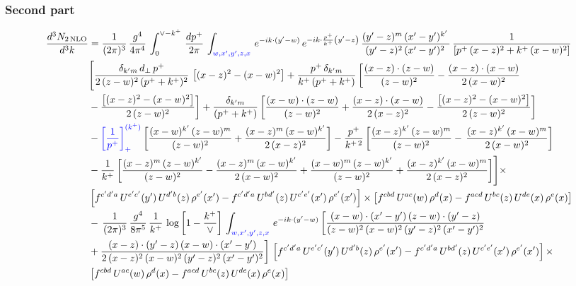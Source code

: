 \documentclass[9pt]{article}
\newcommand{\new}[1]{{\color{blue}#1}}
\numberwithin{equation}{section}
\begin{document}
\subsubsection{Second part}
\begin{align}
 \frac{d^{3}N_{2\,\rm NLO}}{d^{3}k} & = \frac{1}{(2\pi)^{3}}\,\frac{g^{4}}{4\pi^{4}}\,\int_{0}^{\vee-k^{+}}\, \frac{dp^{+}}{2\pi}\,\int_{\new{w,x',y',z,x}}\, e^{-ik\cdot (y'-w)}\,e^{-ik\cdot \frac{p^{+}}{k^{+}}\left(y'-z\right)}\, \frac{(y'-z)^{m}\,(x'-y')^{k'}\,}{(y'-z)^{2}\,(x'-y')^{2}\,}\, \frac{1}{\left[p^{+}\,(x-z)^{2}+k^{+}\,(x-w)^{2}\right]}\notag \\ & \Bigg[\frac{\delta_{k'm}\,d_{\perp}\,p^{+}}{2\,(z-w)^{2}\,(p^{+}+k^{+})^{2}}\, \left[(x-z)^{2}-(x-w)^{2}\right]+\frac{p^{+}\,\delta_{k'm}}{k^{+}\,(p^{+}+k^{+})}\,\bigg[\frac{(x-z)\cdot (z-w)}{(z-w)^{2}} -\frac{(x-z)\cdot (x-w)}{2\,(x-w)^{2}}\notag \\ & -\frac{\left[(x-z)^{2}-(x-w)^{2}\right]}{2\,(z-w)^{2}}\bigg] +\frac{\delta_{k'm}}{(p^{+}+k^{+})}\,\bigg[\frac{(x-w)\cdot (z-w)}{(z-w)^{2}}+\frac{(x-z)\cdot (x-w)}{2\,(x-z)^{2}} -\frac{\left[(x-z)^{2}-(x-w)^{2}\right]}{2\,(z-w)^{2}}\bigg]\notag \\ & -\new{\left[\frac{1}{p^{+}}\right]_{+}^{(k^{+})}}\,\bigg[\frac{(x-w)^{k'}\,(z-w)^{m}}{(z-w)^{2}}+\frac{(x-z)^{m}\,(x-w)^{k'}}{2\,(x-z)^{2}}\bigg]-\frac{p^{+}}{k^{+\,2}}\,\bigg[\frac{(x-z)^{k'}\,(z-w)^{m}}{(z-w)^{2}} -\,\frac{(x-z)^{k'}\,(x-w)^{m}}{2\,(x-w)^{2}}\bigg]\notag \\ & -\frac{1}{k^{+}}\,\bigg[\frac{(x-z)^{m}\,(z-w)^{k'}}{(z-w)^{2}}-\frac{(x-z)^{m}\,(x-w)^{k'}}{2\,(x-w)^{2}}+\frac{(x-w)^{m}\,(z-w)^{k'}}{(z-w)^{2}} +\frac{(x-z)^{k'}\,(x-w)^{m}}{2\,(x-z)^{2}}\bigg]\Bigg]\times\,\notag \\ & \left[f^{c'd'a}\,U^{e'c'}(y')\,U^{d'b}(z)\,\rho^{e'}(x')-f^{c'd'a}\, 
    U^{bd'}(z)\,U^{c'e'}(x')\,\rho^{e'}(x')\right]\times \left[f^{cbd}\,U^{ac}(w)\,\rho^{d}(x) -f^{acd}\,U^{bc}(z)\,U^{de}(x)\,\rho^{e}(x)\right]\notag \\ &  -\, \frac{1}{(2\pi)^{3}}\,\frac{g^{4}}{8\pi^{5}}\,\frac{1}{k^{+}}\,\log{\left[1-\frac{k^{+}}{\vee}\right]}\,\int_{\new{w,x',y',z,x}}\, e^{-ik\cdot (y'-w)}\,\bigg[\frac{(x-w)\cdot (x'-y')\,(z-w)\cdot (y'-z)}{(z-w)^{2}\,(x-w)^{2}\,(y'-z)^{2}\,(x'-y')^{2}}\notag \\ & +\frac{(x-z)\cdot (y'-z)\,(x-w)\cdot (x'-y')}{2\,(x-z)^{2}\,(x-w)^{2}\,(y'-z)^{2}\,(x'-y')^{2}}\bigg]\, \left[f^{c'd'a}\,U^{e'c'}(y')\,U^{d'b}(z)\,\rho^{e'}(x')-f^{c'd'a}\, 
    U^{bd'}(z)\,U^{c'e'}(x')\,\rho^{e'}(x')\right]\times\notag \\ &  \left[f^{cbd}\,U^{ac}(w)\,\rho^{d}(x) -f^{acd}\,U^{bc}(z)\,U^{de}(x)\,\rho^{e}(x)\right] 

\end{align}
\end{document}
